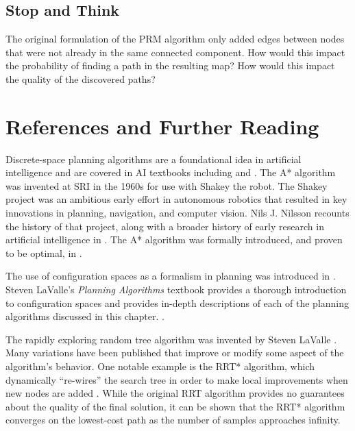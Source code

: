\subsection*{Stop and Think}


\begin{exercise}
  The original formulation of the PRM algorithm only added edges
  between nodes that were not already in the same connected component.
  How would this impact the probability of finding a path in the
  resulting map?  How would this impact the quality of the discovered
  paths?
\end{exercise}





\section{References and Further Reading}

Discrete-space planning algorithms are a foundational idea in
artificial intelligence and are covered in AI textbooks including
\parencite{Russell2003} and \parencite{PooleMackworth17}.  The A*
algorithm was invented at SRI in the 1960s for use with Shakey the
robot.  The Shakey project was an ambitious early effort in autonomous
robotics that resulted in key innovations in planning, navigation, and
computer vision.  Nils J. Nilsson recounts the history of that
project, along with a broader history of early research in artificial
intelligence in \parencite{nilsson2009quest}.  The A* algorithm was
formally introduced, and proven to be optimal, in
\parencite{hart1968}.

The use of configuration spaces as a formalism in planning was
introduced in \parencite{lozano83}. Steven LaValle's \emph{Planning
  Algorithms} textbook provides a thorough introduction to
configuration spaces and provides in-depth descriptions of each of the
planning algorithms discussed in this
chapter. \parencite{lavalle2006planning}.

The rapidly exploring random tree algorithm was invented by Steven LaValle
\parencite{lavalle1998}.  Many variations have been published that
improve or modify some aspect of the algorithm's behavior. One notable
example is the RRT* algorithm, which dynamically ``re-wires'' the
search tree in order to make local improvements when new nodes are
added \parencite{karaman2010incremental}. While the original RRT
algorithm provides no guarantees about the quality of the final
solution, it can be shown that the RRT* algorithm converges on the
lowest-cost path as the number of samples approaches infinity.

